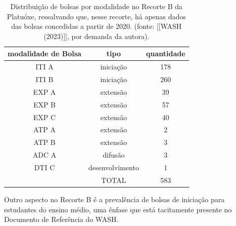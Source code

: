 \documentclass[
12pt,		%
openright,	%
twoside,  %
a4paper,			%
chapter=TITLE,		%
english,			%
french,				%
spanish,			%
brazil				%
]{USPSC-classe/USPSC}
\begin{document}
\noindent\begin{center}\mbox{\centering{}}\end{center}






\begin{table}[htb]
\tiny
\caption{\label{2422b7c7fe35ecc5010472438083776a7ed64d61}Distribui\c{c}\~ao de bolsas por modalidade no Recorte B da Platu\'oxe, ressalvando que, nesse recorte, h\'a apenas dados das bolsas concedidas a partir de 2020. (fonte:  [[WASH (2023)]], por demanda da autora).}

\centering
\begin{tabular}{|c|c|c|}
\hline
modalidade de Bolsa  &  tipo  &  quantidade \\
\hline
ITI A  &  inicia\c{c}\~ao  &  178 \\
ITI B  &  inicia\c{c}\~ao  &  260 \\
EXP A  &  extens\~ao  &  39 \\
EXP B  &  extens\~ao  &  57 \\
EXP C  &  extens\~ao  &  40 \\
ATP A  &  extens\~ao  &  2 \\
ATP B  &  extens\~ao  &  3 \\
ADC A  &  difus\~ao  &  3 \\
DTI C  &  desenvolvimento  &  1 \\
\hline
  &  TOTAL  &  583 \\
\hline
\end{tabular}
\end{table}


Outro aspecto no Recorte B \'e a preval\^encia de bolsas de inicia\c{c}\~ao para estudantes do ensino m\'edio, uma \^enfase que est\'a tacitamente presente no Documento de Refer\^encia do WASH.










\noindent\begin{center}\mbox{\centering{}}\end{center}
\end{document}
